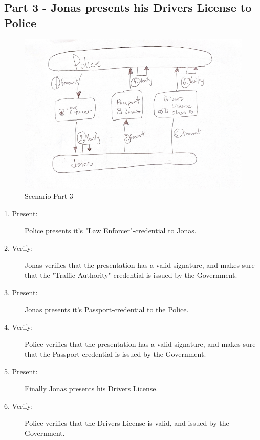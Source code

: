 \newpage

\subsection{Part 3 - Jonas presents his Drivers License to Police}

    \begin{figure}[htbp]
      \centering
      \includegraphics[width=1\textwidth]{figures/scenario-part3.png}
      \caption[]{Scenario Part 3}
    \end{figure}

\begin{description}
    
    \item[1. Present:] Police presents it's "Law Enforcer"-credential to Jonas.
    \item[2. Verify:] Jonas verifies that the presentation has a valid signature, and makes sure that the "Traffic Authority"-credential is issued by the Government.
    \item[3. Present:] Jonas presents it's Passport-credential to the Police.
    \item[4. Verify:] Police verifies that the presentation has a valid signature, and makes sure that the Passport-credential is issued by the Government.
    \item[5. Present:] Finally Jonas presents his Drivers License.
    \item[6. Verify:] Police verifies that the Drivers License is valid, and issued by the Government.
\end{description}
